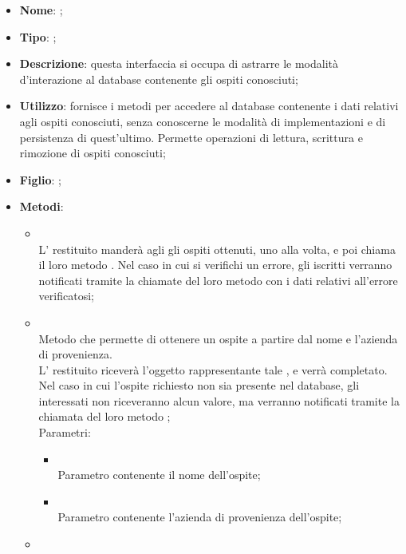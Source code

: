 \begin{itemize}
	\item \textbf{Nome}: ;
	\item \textbf{Tipo}: ;
	\item \textbf{Descrizione}: questa interfaccia si occupa di astrarre le modalità d'interazione al database contenente gli ospiti conosciuti;
	\item \textbf{Utilizzo}: fornisce i metodi per accedere al database contenente i dati relativi agli ospiti conosciuti, senza conoscerne le modalità di implementazioni e di persistenza di quest'ultimo. Permette operazioni di lettura, scrittura e rimozione di ospiti conosciuti;
	\item \textbf{Figlio}: ;
	\item \textbf{Metodi}:
	\begin{itemize}
		\item[]  \\
		L' restituito manderà agli  gli ospiti ottenuti, uno alla volta, e poi chiama il loro metodo . Nel caso in cui si verifichi un errore, gli  iscritti verranno notificati tramite la chiamate del loro metodo  con i dati relativi all'errore verificatosi;\\
		\item[]  \\
		Metodo che permette di ottenere un ospite a partire dal nome e l'azienda di provenienza. \\
L' restituito riceverà l'oggetto rappresentante tale , e verrà completato. Nel caso in cui l'ospite richiesto non sia presente nel database, gli  interessati non riceveranno alcun valore, ma verranno notificati tramite la chiamata del loro metodo ;\\
		Parametri:
		\begin{itemize}
			\item {} \\
			Parametro contenente il nome dell'ospite;
			\item {} \\
			Parametro contenente l'azienda di provenienza dell'ospite;
		\end{itemize}
		\item[]  \\

\end{itemize}
\end{itemize}
